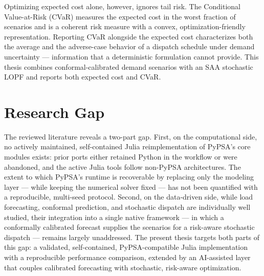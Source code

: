 Optimizing expected cost alone, however, ignores tail risk. The Conditional Value-at-Risk (CVaR) \cite{rockafellar2000cvar} measures the expected cost in the worst fraction of scenarios and is a coherent risk measure with a convex, optimization-friendly representation. Reporting CVaR alongside the expected cost characterizes both the average and the adverse-case behavior of a dispatch schedule under demand uncertainty --- information that a deterministic formulation cannot provide. This thesis combines conformal-calibrated demand scenarios with an SAA stochastic LOPF and reports both expected cost and CVaR.

\section{Research Gap}

The reviewed literature reveals a two-part gap. First, on the computational side, no actively maintained, self-contained Julia reimplementation of PyPSA's core modules exists: prior ports either retained Python in the workflow or were abandoned, and the active Julia tools follow non-PyPSA architectures. The extent to which PyPSA's runtime is recoverable by replacing only the modeling layer --- while keeping the numerical solver fixed --- has not been quantified with a reproducible, multi-seed protocol. Second, on the data-driven side, while load forecasting, conformal prediction, and stochastic dispatch are individually well studied, their integration into a single native framework --- in which a conformally calibrated forecast supplies the scenarios for a risk-aware stochastic dispatch --- remains largely unaddressed. The present thesis targets both parts of this gap: a validated, self-contained, PyPSA-compatible Julia implementation with a reproducible performance comparison, extended by an AI-assisted layer that couples calibrated forecasting with stochastic, risk-aware optimization.
